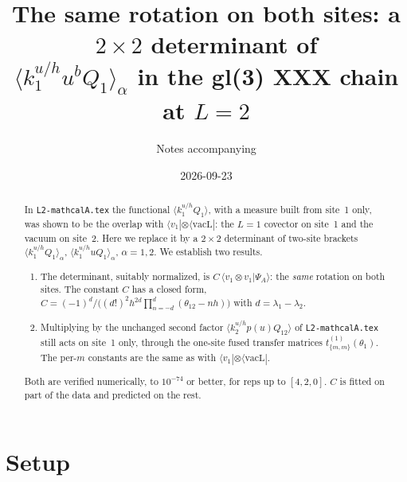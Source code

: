 \documentclass[11pt]{article}
\title{The same rotation on both sites: a $2\times2$ determinant of\\
$\langle k_1^{u/h}u^bQ_1\rangle_\alpha$ in the gl(3) XXX chain at $L=2$}
\author{Notes accompanying \nb{L2-det-mathcalA.wb}}
\date{2026-09-23}
\newcommand{\vacL}{\langle\mathrm{vacL}|}
\newcommand{\nb}[1]{\texttt{#1}}
\theoremstyle{definition}
\theoremstyle{remark}
\begin{document}
\maketitle

\begin{abstract}
In \nb{L2-mathcalA.tex} the functional $\langle k_1^{u/h}Q_1\rangle$, with a measure built from site~1 only, was shown to be the overlap with $\langle v_1|\otimes\vacL$: the $L=1$ covector on site~1 and the vacuum on site~2. Here we replace it by a $2\times2$ determinant of two-site brackets $\langle k_1^{u/h}Q_1\rangle_\alpha$, $\langle k_1^{u/h}uQ_1\rangle_\alpha$, $\alpha=1,2$. We establish two results.
\begin{enumerate}
\item The determinant, suitably normalized, is $C\,\langle v_1\otimes v_1|\Psi_A\rangle$: the \emph{same} rotation on both sites. The constant $C$ has a closed form, $C=(-1)^d/\big((d!)^2h^{2d}\prod_{n=-d}^{d}(\theta_{12}-nh)\big)$ with $d=\lambda_1-\lambda_2$.
\item Multiplying by the unchanged second factor $\langle k_2^{u/h}p(u)Q_{12}\rangle$ of \nb{L2-mathcalA.tex} still acts on site~1 only, through the one-site fused transfer matrices $t^{(1)}_{\{m,m\}}(\theta_1)$. The per-$m$ constants are the same as with $\langle v_1|\otimes\vacL$.
\end{enumerate}
Both are verified numerically, to $10^{-74}$ or better, for reps up to $[4,2,0]$. $C$ is fitted on part of the data and predicted on the rest.
\end{abstract}

\tableofcontents

\section{Setup}
\end{document}

